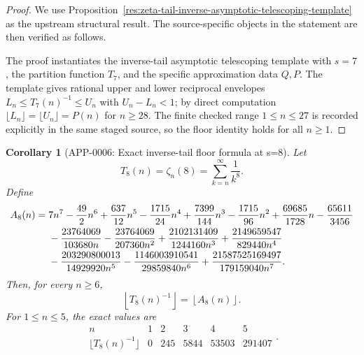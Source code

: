 \documentclass[11pt]{article}
\numberwithin{equation}{section}
\newtheorem{corollary}[theorem]{Corollary}
\theoremstyle{definition}
\theoremstyle{remark}
\newcommand{\1}{\mathbf 1}
\begin{document}
\begin{proof}
We use Proposition~\ref{res:zeta-tail-inverse-asymptotic-telescoping-template} as the upstream structural result. The source-specific objects in the statement are then verified as follows.

The proof instantiates the inverse-tail asymptotic telescoping template with \(s=7\), the partition function \(T_7\), and the specific approximation data \(Q,P\).  The template gives rational upper and lower reciprocal envelopes \(L_n\le T_7(n)^{-1}\le U_n\) with \(U_n-L_n<1\); by direct computation \(\lfloor L_n\rfloor=\lfloor U_n\rfloor=P(n)\) for \(n\ge28\).  The finite checked range \(1\le n\le27\) is recorded explicitly in the same staged source, so the floor identity holds for all \(n\ge1\).
\end{proof}

\begin{corollary}[APP-0006: Exact inverse-tail floor formula at s=8]
\label{thm:tail-s8-floor}
Let
\begin{equation}
\label{eq:tail-s8}
T_8(n)=\zeta_n(8)=\sum_{k=n}^{\infty}\frac1{k^8}.
\end{equation}
Define
\begin{align}
\label{eq:tail-s8-a}
A_8(n)
={}&7n^7-\frac{49}{2}n^6+\frac{637}{12}n^5-\frac{1715}{24}n^4
+\frac{7399}{144}n^3-\frac{1715}{96}n^2+\frac{69685}{1728}n-\frac{65611}{3456}\notag\\
&-\frac{23764069}{103680n}
-\frac{23764069}{207360n^2}
+\frac{2102131409}{1244160n^3}
+\frac{2149659547}{829440n^4}\notag\\
&-\frac{203290800013}{14929920n^5}
-\frac{1146003910541}{29859840n^6}
+\frac{21587525169497}{179159040n^7}.
\end{align}
Then, for every \(n\ge6\),
\begin{equation}
\label{eq:tail-s8-floor}
\left\lfloor T_8(n)^{-1}\right\rfloor=\left\lfloor A_8(n)\right\rfloor.
\end{equation}
For \(1\le n\le5\), the exact values are
\begin{equation}
\label{eq:tail-s8-finite-table}
\begin{array}{c|rrrrr}
n&1&2&3&4&5\\
\hline
\lfloor T_8(n)^{-1}\rfloor&0&245&5844&53503&291407
\end{array}.
\end{equation}


\end{corollary}
\end{document}
